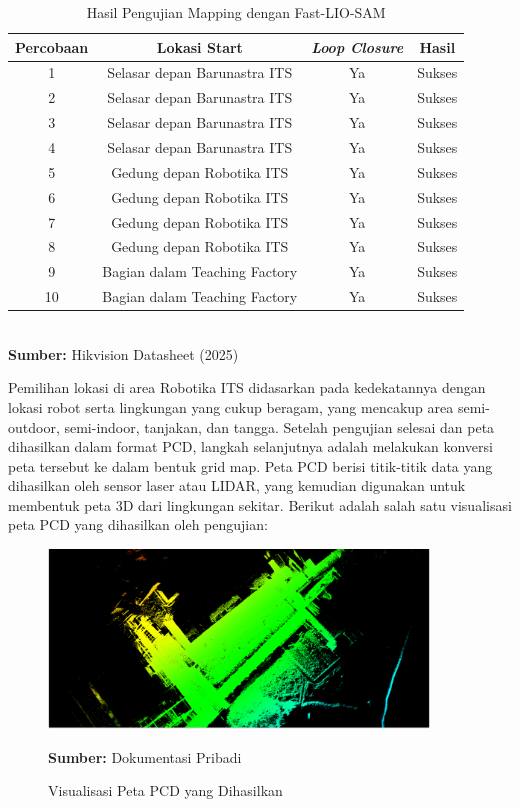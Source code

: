 \begin{table}[H]
\centering
\caption{Hasil Pengujian Mapping dengan Fast-LIO-SAM}
\label{tab:hasil_mapping}
\begin{tabular}{|c|c|c|c|}
\hline
Percobaan & Lokasi Start                  & \emph{Loop Closure} & Hasil   \\ \hline
1         & Selasar depan Barunastra ITS   & Ya           & Sukses  \\ \hline
2         & Selasar depan Barunastra ITS   & Ya           & Sukses  \\ \hline
3         & Selasar depan Barunastra ITS   & Ya           & Sukses  \\ \hline
4         & Selasar depan Barunastra ITS   & Ya           & Sukses  \\ \hline
5         & Gedung depan Robotika ITS      & Ya           & Sukses  \\ \hline
6         & Gedung depan Robotika ITS      & Ya           & Sukses  \\ \hline
7         & Gedung depan Robotika ITS      & Ya           & Sukses  \\ \hline
8         & Gedung depan Robotika ITS      & Ya           & Sukses  \\ \hline
9         & Bagian dalam Teaching Factory & Ya           & Sukses  \\ \hline
10        & Bagian dalam Teaching Factory & Ya           & Sukses  \\ \hline
\end{tabular}
\footnotesize\\ \textbf{Sumber:} Hikvision Datasheet (2025)

\end{table}

Pemilihan lokasi di area Robotika ITS didasarkan pada kedekatannya dengan lokasi robot serta lingkungan yang cukup beragam, yang mencakup area semi-outdoor, semi-indoor, tanjakan, dan tangga. Setelah pengujian selesai dan peta dihasilkan dalam format PCD, langkah selanjutnya adalah melakukan konversi peta tersebut ke dalam bentuk grid map. Peta PCD berisi titik-titik data yang dihasilkan oleh sensor laser atau LIDAR, yang kemudian digunakan untuk membentuk peta 3D dari lingkungan sekitar. Berikut adalah salah satu visualisasi peta PCD yang dihasilkan oleh pengujian:

\begin{figure}[H]
    \centering
    \includegraphics[width=0.9\textwidth]{gambar/bab4/poincloud-map.png}
    \caption{Visualisasi Peta PCD yang Dihasilkan}
    \footnotesize{\textbf{Sumber:} Dokumentasi Pribadi}
    \label{fig:peta_pcd}
\end{figure}

